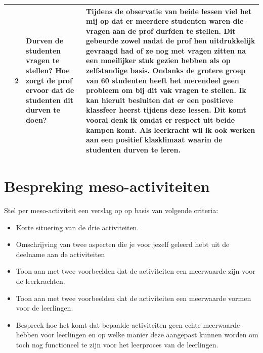 \documentclass[a4paper,12pt,twoside]{article}%
\begin{document}
\begin{landscape}
\begin{tabularx}{1.56\textwidth}{|Q{0.25\textwidth}|Q{0.1\textwidth}|Q{0.25\textwidth}|Q{0.85\textwidth}|}
		\end{tabularx}
		
		\begin{tabularx}{1.56\textwidth}{|Q{0.25\textwidth}|Q{0.1\textwidth}|Q{0.25\textwidth}|Q{0.85\textwidth}|}	& 2 & Durven de studenten vragen te stellen? Hoe zorgt de prof ervoor dat de studenten dit durven te doen? & Tijdens de observatie van beide lessen viel het mij op dat er meerdere studenten waren die vragen aan de prof durfden te stellen. Dit gebeurde zowel nadat de prof hen uitdrukkelijk gevraagd had of ze nog met vragen zitten na een moeilijker stuk gezien hebben als op zelfstandige basis. Ondanks de grotere groep van 60 studenten heeft het merendeel geen probleem om bij dit vak vragen te stellen. Ik kan hieruit besluiten dat er een positieve klassfeer heerst tijdens deze lessen. Dit komt vooral denk ik omdat er respect uit beide kampen komt. Als leerkracht wil ik ook werken aan een positief klasklimaat waarin de studenten durven te leren. \\\hline	
		\end{tabularx}
	\end{landscape}






	
	
	
	
	
	
	
	
	
	
	
	
	\section{Bespreking meso-activiteiten}
	Stel per meso-activiteit een verslag op op basis van volgende criteria:
	\begin{itemize}
		\item Korte situering van de drie activiteiten.
		\item Omschrijving van twee aspecten die je voor jezelf geleerd hebt uit de deelname aan de activiteiten
		\item  Toon aan met twee voorbeelden dat de activiteiten een meerwaarde zijn voor de leerkrachten.
		\item Toon aan met twee voorbeelden dat de activiteiten een meerwaarde vormen voor de leerlingen.
		\item Bespreek hoe het komt dat bepaalde activiteiten geen echte meerwaarde hebben voor leerlingen en op welke manier deze aangepast kunnen worden om toch nog functioneel te zijn voor het leerproces van de leerlingen.
	\end{itemize}
	
\end{document}
